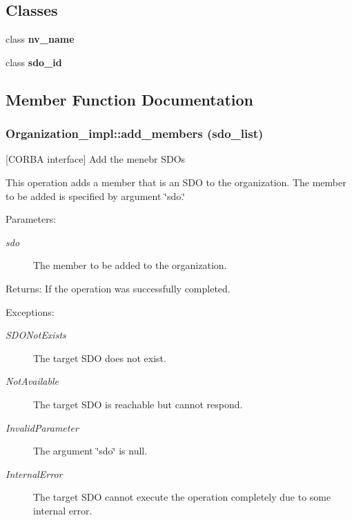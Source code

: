 \subsection*{Classes}
\begin{CompactItemize}
\item 
class {\bf nv\_\-name}
\item 
class {\bf sdo\_\-id}
\end{CompactItemize}


\subsection{Member Function Documentation}
\subsubsection{\setlength{\rightskip}{0pt plus 5cm}Organization\_\-impl::add\_\-members (sdo\_\-list)}\label{classOrganization__impl_Organization__impla10}


[CORBA interface] Add the menebr SDOs 

This operation adds a member that is an SDO to the organization. The member to be added is specified by argument \char`\"{}sdo.\char`\"{}

\begin{Desc}
\item[Parameters:]
\begin{description}
\item[{\em sdo}]The member to be added to the organization. \end{description}
\end{Desc}
\begin{Desc}
\item[Returns:]If the operation was successfully completed. \end{Desc}
\begin{Desc}
\item[Exceptions:]
\begin{description}
\item[{\em SDONot\-Exists}]The target SDO does not exist. \item[{\em Not\-Available}]The target SDO is reachable but cannot respond. \item[{\em Invalid\-Parameter}]The argument \char`\"{}sdo\char`\"{} is null. \item[{\em Internal\-Error}]The target SDO cannot execute the operation completely due to some internal error.\end{description}
\end{Desc}
